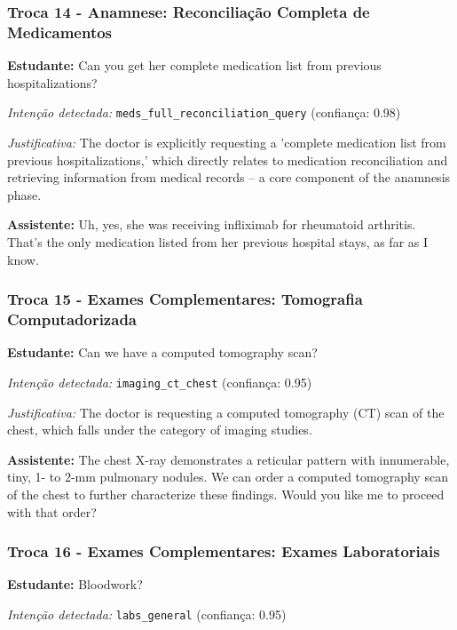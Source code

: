 \subsubsection*{Troca 14 - Anamnese: Reconciliação Completa de Medicamentos}

\textbf{Estudante:} Can you get her complete medication list from previous hospitalizations?

\textit{Intenção detectada:} \texttt{meds\_full\_reconciliation\_query} (confiança: 0.98)

\textit{Justificativa:} The doctor is explicitly requesting a 'complete medication list from previous hospitalizations,' which directly relates to medication reconciliation and retrieving information from medical records – a core component of the anamnesis phase.

\textbf{Assistente:} Uh, yes, she was receiving infliximab for rheumatoid arthritis. That's the only medication listed from her previous hospital stays, as far as I know.

\vspace{0.5cm}

\subsubsection*{Troca 15 - Exames Complementares: Tomografia Computadorizada}

\textbf{Estudante:} Can we have a computed tomography scan?

\textit{Intenção detectada:} \texttt{imaging\_ct\_chest} (confiança: 0.95)

\textit{Justificativa:} The doctor is requesting a computed tomography (CT) scan of the chest, which falls under the category of imaging studies.

\textbf{Assistente:} The chest X-ray demonstrates a reticular pattern with innumerable, tiny, 1- to 2-mm pulmonary nodules. We can order a computed tomography scan of the chest to further characterize these findings. Would you like me to proceed with that order?

\vspace{0.5cm}

\subsubsection*{Troca 16 - Exames Complementares: Exames Laboratoriais}

\textbf{Estudante:} Bloodwork?

\textit{Intenção detectada:} \texttt{labs\_general} (confiança: 0.95)

